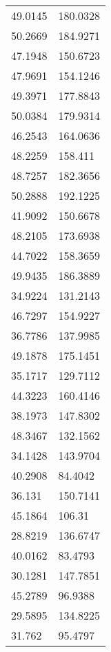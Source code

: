 \documentclass[bwprint]{gmcmthesis}
\begin{document}
\begin{longtable}{ll}
49.0145           & 180.0328           \\
50.2669           & 184.9271           \\
47.1948           & 150.6723           \\
47.9691           & 154.1246           \\
49.3971           & 177.8843           \\
50.0384           & 179.9314           \\
46.2543           & 164.0636           \\
48.2259           & 158.411            \\
48.7257           & 182.3656           \\
50.2888           & 192.1225           \\
41.9092           & 150.6678           \\
48.2105           & 173.6938           \\
44.7022           & 158.3659           \\
49.9435           & 186.3889           \\
34.9224           & 131.2143           \\
46.7297           & 154.9227           \\
36.7786           & 137.9985           \\
49.1878           & 175.1451           \\
35.1717           & 129.7112           \\
44.3223           & 160.4146           \\
38.1973           & 147.8302           \\
48.3467           & 132.1562           \\
34.1428           & 143.9704           \\
40.2908           & 84.4042            \\
36.131            & 150.7141           \\
45.1864           & 106.31             \\
28.8219           & 136.6747           \\
40.0162           & 83.4793            \\
30.1281           & 147.7851           \\
45.2789           & 96.9388            \\
29.5895           & 134.8225           \\
31.762            & 95.4797            \\

\end{longtable}
\end{document}
